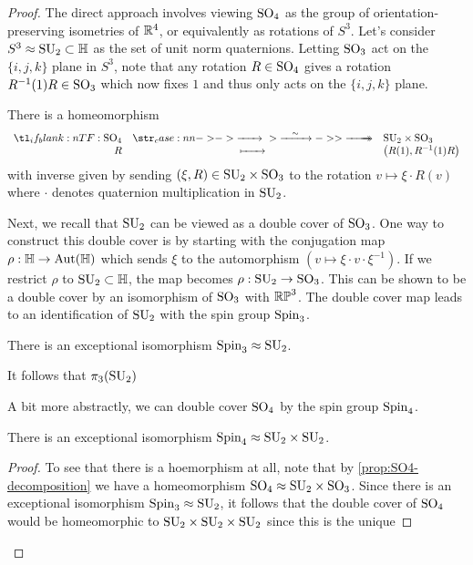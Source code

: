 \begin{proof}
	\color{red}

The direct approach involves viewing ${\operatorname{SO}}_4$ as the group of orientation-preserving isometries of $\mathbb{R}^4$, or equivalently as rotations of $S^3$. Let's consider $S^3\approx {\operatorname{SU}}_2\subset \mathbb{H}$ as the set of unit norm quaternions. Letting ${\operatorname{SO}}_3$ act on the $\{i,j,k\}$ plane in $S^3$, note that any rotation $R\in {\operatorname{SO}}_4$ gives a rotation $R^{-1}(1)R\in {\operatorname{SO}}_3$ which now fixes $1$ and thus only acts on the $\{i,j,k\}$ plane. 
\begin{changemargins}
\begin{lemma}\label{prop:SO4-decomposition}
	There is a homeomorphism
	\begin{equation}
		\lkxfunc{}{\SO_4}{\SU_2\times \SO_3}{R}{\left(R(1),R^{-1}(1)R\right)}
	\end{equation}
	with inverse given by sending $(\xi, R)\in {\operatorname{SU}}_2\times {\operatorname{SO}}_3$ to the rotation $v\mapsto \xi \cdot R(v)$ where $\cdot$ denotes quaternion multiplication in ${\operatorname{SU}}_2$.
\end{lemma}
\end{changemargins}

%

Next, we recall that ${\operatorname{SU}}_2$ can be viewed as a double cover of ${\operatorname{SO}}_3$. One way to construct this double cover is by starting with the 
conjugation map $\rho : \mathbb{H} \to \operatorname{Aut}(\mathbb{H})$ which sends $\xi$ to the automorphism $(v\mapsto \xi\cdot v\cdot \xi^{-1})$. If we restrict $\rho$ to ${\operatorname{SU}}_2\subset \mathbb{H}$, the map becomes $\rho : {\operatorname{SU}}_2 \to {\operatorname{SO}}_3$. This can be shown to be a double cover by an isomorphism of ${\operatorname{SO}}_3$ with $\mathbb{RP}^3$. The double cover map leads to an identification of ${\operatorname{SU}}_2$ with the spin group ${\operatorname{Spin}}_3$.
\begin{proposition}
	There is an exceptional isomorphism ${\operatorname{Spin}}_3\approx {\operatorname{SU}}_2$.
\end{proposition}

It follows that $\pi_3({\operatorname{SU}}_2)$

A bit more abstractly, we can double cover ${\operatorname{SO}}_4$ by the spin group ${\operatorname{Spin}}_4$. 
\begin{proposition}\label{prop:exceptional-isomorphism-spin4}
	There is an exceptional isomorphism ${\operatorname{Spin}}_4\approx {\operatorname{SU}}_2\times {\operatorname{SU}}_2$.
\end{proposition}
\begin{proof}
	To see that there is a hoemorphism at all, note that by \cref{prop:SO4-decomposition} we have a homeomorphism ${\operatorname{SO}}_4\approx {\operatorname{SU}}_2\times {\operatorname{SO}}_3$. Since there is an exceptional isomorphism ${\operatorname{Spin}}_3\approx {\operatorname{SU}}_2$, it follows that the double cover of ${\operatorname{SO}}_4$ would be homeomorphic to ${\operatorname{SU}}_2\times {\operatorname{SU}}_2\times {\operatorname{SU}}_2$ since this is the unique


\end{proof}
\end{proof}
